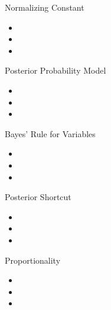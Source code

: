 \documentclass[12pt]{beamer}
\begin{document}
\begin{frame}{}
\begin{block}{Normalizing Constant}
\begin{itemize}
\item 
\item 
\item 
\end{itemize}
\end{block}
\end{frame}

\begin{frame}{}
\begin{block}{Posterior Probability Model}
\begin{itemize}
\item 
\item 
\item 
\end{itemize}
\end{block}
\end{frame}

\begin{frame}{}
\begin{block}{Bayes’ Rule for Variables}
\begin{itemize}
\item 
\item 
\item 
\end{itemize}
\end{block}
\end{frame}

\begin{frame}{}
\begin{block}{Posterior Shortcut}
\begin{itemize}
\item 
\item 
\item 
\end{itemize}
\end{block}
\end{frame}

\begin{frame}{}
\begin{block}{Proportionality}
\begin{itemize}
\item 
\item 
\item 
\end{itemize}
\end{block}
\end{frame}
\end{document}
